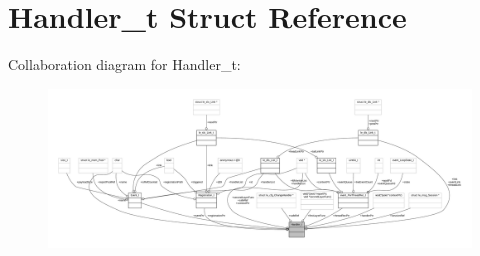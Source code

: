 \hypertarget{struct_handler__t}{}\section{Handler\+\_\+t Struct Reference}
\label{struct_handler__t}


Collaboration diagram for Handler\+\_\+t\+:
\nopagebreak
\begin{figure}[H]
\begin{center}
\leavevmode
\includegraphics[width=350pt]{struct_handler__t__coll__graph}
\end{center}
\end{figure}
